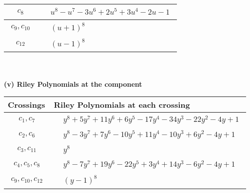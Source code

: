 \documentclass[1p]{elsarticle_modified}
\theoremstyle{definition}
\begin{document}
\begin{tabular}{m{50pt}|m{274pt}}
\hline $$\begin{aligned}c_{8}\end{aligned}$$&$\begin{aligned}
&u^8- u^7-3 u^6+2 u^5+3 u^4-2 u-1
\end{aligned}$\\
\hline $$\begin{aligned}c_{9},c_{10}\end{aligned}$$&$\begin{aligned}
&(u+1)^8
\end{aligned}$\\
\hline $$\begin{aligned}c_{12}\end{aligned}$$&$\begin{aligned}
&(u-1)^8
\end{aligned}$\\
\hline
\end{tabular}\\~\\
\newpage\renewcommand{\arraystretch}{1}
\flushleft \textbf{(v) Riley Polynomials at the component}\newline \\
\begin{tabular}{m{50pt}|m{274pt}}
Crossings & \hspace{64pt}Riley Polynomials at each crossing \\
\hline $$\begin{aligned}c_{1},c_{7}\end{aligned}$$&$\begin{aligned}
&y^8+5 y^7+11 y^6+6 y^5-17 y^4-34 y^3-22 y^2-4 y+1
\end{aligned}$\\
\hline $$\begin{aligned}c_{2},c_{6}\end{aligned}$$&$\begin{aligned}
&y^8-3 y^7+7 y^6-10 y^5+11 y^4-10 y^3+6 y^2-4 y+1
\end{aligned}$\\
\hline $$\begin{aligned}c_{3},c_{11}\end{aligned}$$&$\begin{aligned}
&y^8
\end{aligned}$\\
\hline $$\begin{aligned}c_{4},c_{5},c_{8}\end{aligned}$$&$\begin{aligned}
&y^8-7 y^7+19 y^6-22 y^5+3 y^4+14 y^3-6 y^2-4 y+1
\end{aligned}$\\
\hline $$\begin{aligned}c_{9},c_{10},c_{12}\end{aligned}$$&$\begin{aligned}
&(y-1)^8
\end{aligned}$\\
\hline
\end{tabular}\\~\\
\end{document}
